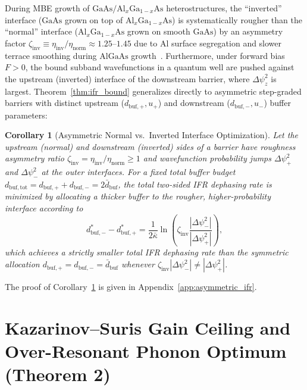 \documentclass[11pt,letterpaper]{article}
\newtheorem{corollary}{Corollary}
\begin{document}
During MBE growth of $\mathrm{GaAs}/\mathrm{Al}_x\mathrm{Ga}_{1-x}\mathrm{As}$ heterostructures, the ``inverted'' interface ($\mathrm{GaAs}$ grown on top of $\mathrm{Al}_x\mathrm{Ga}_{1-x}\mathrm{As}$) is systematically rougher than the ``normal'' interface ($\mathrm{Al}_x\mathrm{Ga}_{1-x}\mathrm{As}$ grown on smooth $\mathrm{GaAs}$) by an asymmetry factor $\zeta_{\mathrm{inv}} \equiv \eta_{\mathrm{inv}}/\eta_{\mathrm{norm}} \approx 1.25\text{--}1.45$ due to $\mathrm{Al}$ surface segregation and slower terrace smoothing during $\mathrm{AlGaAs}$ growth~\cite{Shitara1993,LiLinfieldRoadmap2025}. Furthermore, under forward bias $F > 0$, the bound subband wavefunctions in a quantum well are pushed against the upstream (inverted) interface of the downstream barrier, where $\Delta\psi_z^2$ is largest. Theorem~\ref{thm:ifr_bound} generalizes directly to asymmetric step-graded barriers with distinct upstream ($d_{\mathrm{buf,+}}, u_+$) and downstream ($d_{\mathrm{buf,-}}, u_-$) buffer parameters:

\begin{corollary}[Asymmetric Normal vs.\ Inverted Interface Optimization]
\label{cor:asymmetric_ifr}
Let the upstream (normal) and downstream (inverted) sides of a barrier have roughness asymmetry ratio $\zeta_{\mathrm{inv}} = \eta_{\mathrm{inv}}/\eta_{\mathrm{norm}} \ge 1$ and wavefunction probability jumps $\Delta\psi_+^2$ and $\Delta\psi_-^2$ at the outer interfaces. For a fixed total buffer budget $d_{\mathrm{buf,tot}} = d_{\mathrm{buf,+}} + d_{\mathrm{buf,-}} = 2\bar{d}_{\mathrm{buf}}$, the total two-sided IFR dephasing rate is minimized by allocating a thicker buffer to the rougher, higher-probability interface according to
\begin{equation}
d_{\mathrm{buf,-}}^* - d_{\mathrm{buf,+}}^* = \frac{1}{2\bar{\kappa}}\ln\!\left(\zeta_{\mathrm{inv}} \frac{|\Delta\psi_-^2|}{|\Delta\psi_+^2|}\right),
\label{eq:cor1_allocation}
\end{equation}
which achieves a strictly smaller total IFR dephasing rate than the symmetric allocation $d_{\mathrm{buf,+}} = d_{\mathrm{buf,-}} = \bar{d}_{\mathrm{buf}}$ whenever $\zeta_{\mathrm{inv}}|\Delta\psi_-^2| \neq |\Delta\psi_+^2|$.
\end{corollary}

The proof of Corollary~\ref{cor:asymmetric_ifr} is given in Appendix~\ref{app:asymmetric_ifr}.

\section{Kazarinov--Suris Gain Ceiling and Over-Resonant Phonon Optimum (Theorem 2)}
\label{sec:theorem2}
\end{document}
